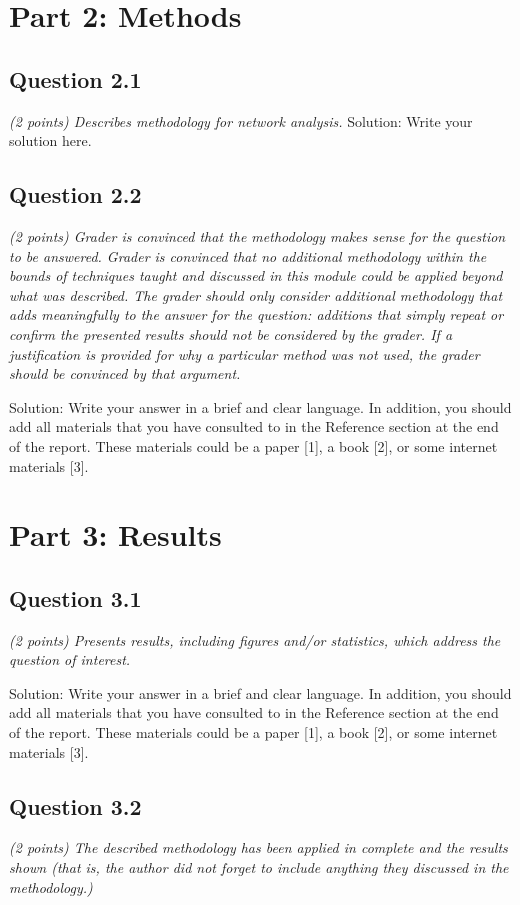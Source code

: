 \documentclass[12pt]{article}
\begin{document}
\section{Part 2: Methods}

\subsection{Question 2.1}
\textit{ (2 points) Describes methodology for network analysis.}
Solution: Write your solution here.

\subsection{Question 2.2}
\textit{(2 points) Grader is convinced that the methodology makes sense for the question to be answered. Grader is convinced that no additional methodology within the bounds of techniques taught and discussed in this module could be applied beyond what was described. The grader should only consider additional methodology that adds meaningfully to the answer for the question: additions that simply repeat or confirm the presented results should not be considered by the grader. If a justification is provided for why a particular method was not used, the grader should be convinced by that argument. }

Solution: Write your answer in a brief and clear language. In addition, you should add all materials that you have consulted to in the Reference section at the end of the report. These materials could be a paper [1], a book [2], or some internet materials [3].

\section{Part 3: Results}

\subsection{Question 3.1}
\textit{(2 points) Presents results, including figures and/or statistics, which address the question of interest.}

Solution: Write your answer in a brief and clear language. In addition, you should add all materials that you have consulted to in the Reference section at the end of the report. These materials could be a paper [1], a book [2], or some internet materials [3].

\subsection{Question 3.2}
\textit{(2 points) The described methodology has been applied in complete and the results shown (that is, the author did not forget to include anything they discussed in the methodology.) }
\end{document}
